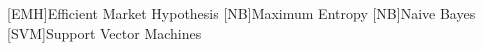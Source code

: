 \begin{acronym}[SVM]
    [EMH]{Efficient Market Hypothesis}
    [NB]{Maximum Entropy}
    [NB]{Naive Bayes}
    [SVM]{Support Vector Machines}
\end{acronym}
